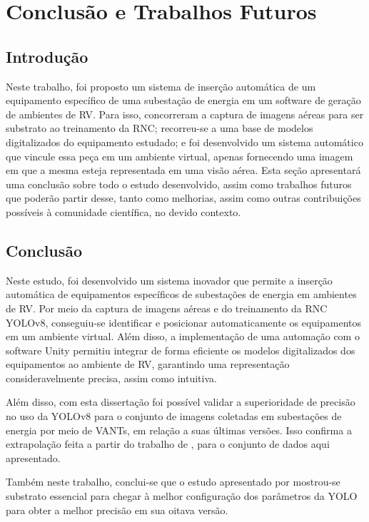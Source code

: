 \chapter{Conclusão e Trabalhos Futuros}

\section{Introdução} 

Neste trabalho, foi proposto um sistema de inserção automática de um equipamento específico de uma subestação de energia em um software de geração de ambientes de RV. Para isso, concorreram a captura de imagens aéreas para ser substrato ao treinamento da RNC; recorreu-se a uma base de modelos digitalizados do equipamento estudado; e foi desenvolvido um sistema automático que vincule essa peça em um ambiente virtual, apenas fornecendo uma imagem em que a mesma esteja representada em uma visão aérea. Esta seção apresentará uma conclusão sobre todo o estudo desenvolvido, assim como trabalhos futuros que poderão partir desse, tanto como melhorias, assim como outras contribuições possíveis à comunidade científica, no devido contexto.

\section{Conclusão} 

Neste estudo, foi desenvolvido um sistema inovador que permite a inserção automática de equipamentos específicos de subestações de energia em ambientes de RV. Por meio da captura de imagens aéreas e do treinamento da RNC YOLOv8, conseguiu-se identificar e posicionar automaticamente os equipamentos em um ambiente virtual. Além disso, a implementação de uma automação com o software Unity permitiu integrar de forma eficiente os modelos digitalizados dos equipamentos ao ambiente de RV, garantindo uma representação consideravelmente precisa, assim como intuitiva.

Além disso, com esta dissertação foi possível validar a superioridade de precisão no uso da YOLOv8 para o conjunto de imagens coletadas em subestações de energia por meio de VANTs, em relação a suas últimas versões. Isso confirma a extrapolação feita a partir do trabalho de \cite{ultralytics2023yolo}, para o conjunto de dados aqui apresentado. 

Também neste trabalho, conclui-se que o estudo apresentado por \cite{gonzaga2023identificaccao} mostrou-se substrato essencial para chegar à melhor configuração dos parâmetros da YOLO para obter a melhor precisão em sua oitava versão.


